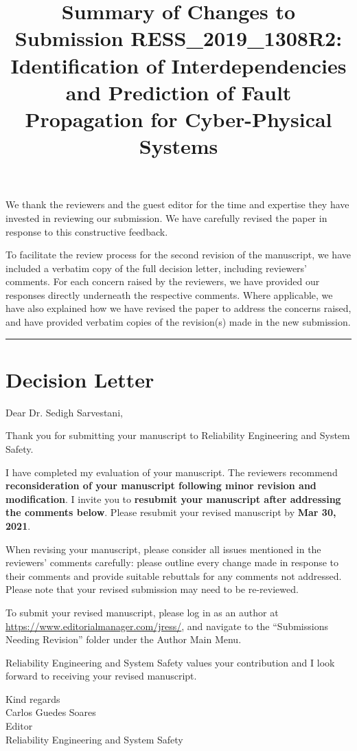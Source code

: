 \documentclass{article}
\title{Summary of Changes to Submission RESS\_2019\_1308R2: \\
Identification of Interdependencies and Prediction of Fault Propagation for Cyber-Physical Systems}
\date{}
\begin{document}
\maketitle
\noindent
We thank the reviewers and the guest editor for the time and expertise they have invested in reviewing our submission. We have carefully revised the paper in response to this constructive feedback.

To facilitate the review process for the second revision of the manuscript, we have included a verbatim copy of the full decision letter, including reviewers' comments. For each concern raised by the reviewers, we have provided our responses directly underneath the respective comments. Where applicable, we have also explained how we have revised the paper to address the concerns raised, and have provided verbatim copies of the revision(s) made in the new submission. \vspace{3em}

\noindent\rule[0.5ex]{\linewidth}{1pt}

\section{Decision Letter}
\label{sec:decision_letter}
Dear Dr. Sedigh Sarvestani,

Thank you for submitting your manuscript to Reliability Engineering and System Safety.

I have completed my evaluation of your manuscript. The reviewers recommend \textbf{reconsideration of your manuscript following minor revision and modification}. I invite you to \textbf{resubmit your manuscript after addressing the comments below}. Please resubmit your revised manuscript by \textbf{Mar 30, 2021}.

When revising your manuscript, please consider all issues mentioned in the reviewers' comments carefully: please outline every change made in response to their comments and provide suitable rebuttals for any comments not addressed. Please note that your revised submission may need to be re-reviewed.

To submit your revised manuscript, please log in as an author at \url{https://www.editorialmanager.com/jress/}, and navigate to the ``Submissions Needing Revision'' folder under the Author Main Menu.

Reliability Engineering and System Safety values your contribution and I look forward to receiving your revised manuscript.

Kind regards \\
Carlos Guedes Soares \\
Editor \\
Reliability Engineering and System Safety
\end{document}
